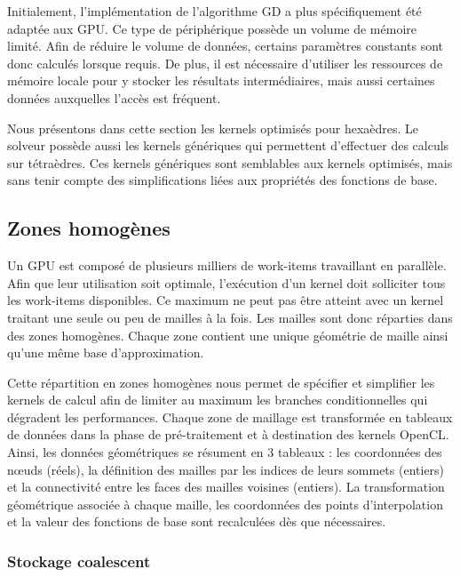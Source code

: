 Initialement, l’implémentation de l’algorithme GD a plus spécifiquement été adaptée
aux GPU. Ce type de périphérique possède un volume de mémoire limité. Afin de
réduire le volume de données, certains paramètres constants sont donc calculés
lorsque requis. De plus, il est nécessaire d’utiliser les ressources
de mémoire locale pour y stocker les résultats intermédiaires, mais aussi
certaines données auxquelles l’accès est fréquent.

\begin{remark}
	Nous présentons dans cette section les kernels optimisés
	pour hexaèdres. Le solveur possède aussi les kernels
	génériques qui permettent d'effectuer des calculs
	sur tétraèdres. Ces kernels génériques sont semblables
	aux kernels optimisés, mais sans tenir compte des
	simplifications liées aux propriétés des fonctions
	de base.
	\\
\end{remark}


\subsection{Zones homogènes}
\label{ssect:zones_homogenes}

Un GPU est composé de plusieurs milliers de work-items travaillant
en parallèle. Afin que leur utilisation soit optimale, l'exécution d'un kernel
doit solliciter tous les work-items disponibles. Ce maximum ne peut pas être atteint
avec un kernel traitant une seule ou peu de mailles à la fois. Les mailles sont
donc réparties dans des zones homogènes. Chaque zone contient une unique géométrie
de maille ainsi qu’une même base d’approximation.

Cette répartition en zones homogènes nous permet de spécifier et simplifier les
kernels de calcul afin de limiter au maximum les branches conditionnelles
qui dégradent les performances.
Chaque zone de maillage est transformée en tableaux de données dans la phase de
pré-traitement et à destination des kernels OpenCL.
Ainsi, les données géométriques se résument en $3$ tableaux :
les coordonnées des nœuds (réels), la définition des mailles par les indices de leurs
sommets (entiers) et la connectivité entre les faces des mailles voisines (entiers).
La transformation géométrique associée à chaque maille, les coordonnées des points
d'interpolation et la valeur des fonctions de base sont recalculées dès que
nécessaires.


\subsubsection{Stockage coalescent}
\label{sssect:zones_homogenes_coalescent}

